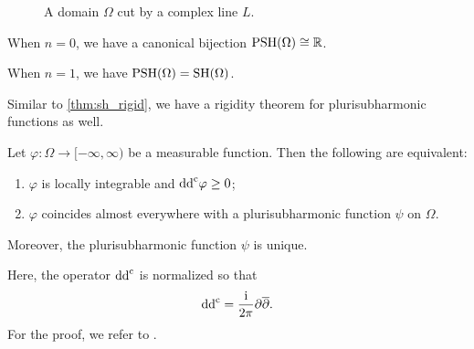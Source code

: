 \begin{figure}[ht]
\centering
{}
\caption{A domain $\Omega$ cut by a complex line $L$.}
\label{fig:psh}
\end{figure}

\begin{example}\label{ex:pshfunctions:L104}
    When $n=0$, we have a canonical bijection $\mathrm{PSH}(\Omega)\cong \mathbb{R}$.
\end{example}

\begin{example}
    When $n=1$, we have $\mathrm{PSH}(\Omega)=\mathrm{SH}(\Omega)$.
\end{example}

Similar to \cref{thm:sh_rigid}, we have a rigidity theorem for plurisubharmonic functions as well.
\begin{theorem}\label{thm:psh_rigid}
    Let $\varphi\colon \Omega\rightarrow [-\infty,\infty)$ be a measurable function. Then the following are equivalent:
    \begin{enumerate}
        \item\label{itm:thm:psh_rigid:1} $\varphi$ is locally integrable and $\mathrm{dd}^{\mathrm{c}}\varphi\geq 0$;
        \item\label{itm:thm:psh_rigid:2} $\varphi$ coincides almost everywhere with a plurisubharmonic function $\psi$ on $\Omega$.
    \end{enumerate}
    Moreover, the plurisubharmonic function $\psi$ is unique.
\end{theorem}
Here, the operator $\mathrm{dd}^{\mathrm{c}}$ is normalized so that
\[
\mathrm{dd}^{\mathrm{c}} =\frac{\mathrm{i}}{2\pi}\partial \overline{\partial}.
\]
For the proof, we refer to \cite[Proposition~1.43]{GZ17}.

